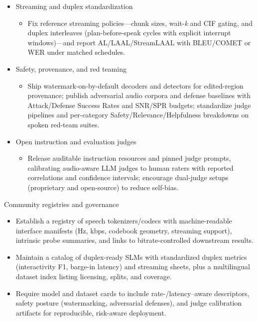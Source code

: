 \documentclass{article}
\begin{document}
\begin{itemize}
  \item Streaming and duplex standardization
  \begin{itemize}
    \item Fix reference streaming policies—chunk sizes, wait-\emph{k} and CIF gating, and duplex interleaves (plan-before-speak cycles with explicit interrupt windows)—and report AL/LAAL/StreamLAAL with BLEU/COMET or WER under matched schedules.
  \end{itemize}

  \item Safety, provenance, and red teaming
  \begin{itemize}
    \item Ship watermark-on-by-default decoders and detectors for edited-region provenance; publish adversarial audio corpora and defense baselines with Attack/Defense Success Rates and SNR/SPR budgets; standardize judge pipelines and per-category Safety/Relevance/Helpfulness breakdowns on spoken red-team suites.
  \end{itemize}

  \item Open instruction and evaluation judges
  \begin{itemize}
    \item Release auditable instruction resources and pinned judge prompts, calibrating audio-aware LLM judges to human raters with reported correlations and confidence intervals; encourage dual-judge setups (proprietary and open-source) to reduce self-bias.
  \end{itemize}

\end{itemize}

Community registries and governance

\begin{itemize}
  \item Establish a registry of speech tokenizers/codecs with machine-readable interface manifests (Hz, kbps, codebook geometry, streaming support), intrinsic probe summaries, and links to bitrate-controlled downstream results.
  \item Maintain a catalog of duplex-ready SLMs with standardized duplex metrics (interactivity F1, barge-in latency) and streaming sheets, plus a multilingual dataset index listing licensing, splits, and coverage.
  \item Require model and dataset cards to include rate-/latency–aware descriptors, safety posture (watermarking, adversarial defenses), and judge calibration artifacts for reproducible, risk-aware deployment.
\end{itemize}
\end{document}
